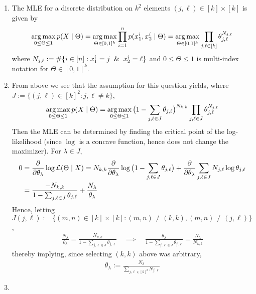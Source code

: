 \documentclass{article}
\begin{document}
\begin{enumerate}
\item The MLE for a discrete distribution on $k^2$ elements
  $(j,\ell) \in [k]\times [k]$ is given by
  \begin{align*}
    \mathop{\rm arg\,max}_{0\leq \Theta \leq 1} p(X \mid \Theta) = \mathop{\rm arg\,max}_{\Theta\in [0,1]^k}
    \prod_{i=1}^n p(x^i_1, x^i_2 \mid \Theta) = \mathop{\rm arg\,max}_{\Theta \in [0,1]^k}
    \prod_{j,\ell \in [k]} \theta_{j,\ell}^{N_{j,\ell}}
  \end{align*}
  where $N_{j,\ell} := \#\{ i \in [n] : x^i_1 = j \And x^i_2 = \ell \}$ and
  $0 \leq \Theta \leq 1$ is multi-index notation for
  $\Theta \in [0,1]^k$.

\item From above we see that the assumption for this question yields, where $J
  := \{ (j,\ell) \in [k]^2 : j, \ell \neq k\}$,
  \begin{align*}
    \mathop{\rm arg\,max}_{0 \leq \Theta \leq 1} p(X \mid \Theta) = \mathop{\rm arg\,max}_{0 \leq \Theta
    \leq 1} \big( 1 - \sum_{j, \ell \in J} \theta_{j, \ell} \big)^{N_{k,k}} \prod_{j,\ell \in J} \theta_{j, \ell}^{N_{j,\ell}}
  \end{align*}
  Then the MLE can be determined by finding the critical point of the
  log-likelihood (since $\log$ is a concave function, hence does not change the
  maximizer). For $\lambda \in J$,
  \begin{align*}
    0 &= \frac{\partial}{\partial\theta_\lambda} \log \mathcal{L}(\Theta \mid X) =
        N_{k,k}\frac{\partial}{\partial\theta_\lambda} \log\big(1 -
        \sum_{j,\ell \in J} \theta_{j,\ell}\big)
        + \frac{\partial}{\partial\theta_\lambda} \sum_{j,\ell \in J} N_{j, \ell} \log \theta_{j, \ell}
    \\
      &= \frac{-N_{k,k}}{1 - \sum_{j,\ell \in J}\theta_{j,\ell}} +
        \frac{N_\lambda}{\theta_\lambda}
  \end{align*}
  Hence, letting
  $J(j,\ell) := \{(m,n) \in [k]\times [k] : (m,n) \neq (k,k), (m,n) \neq
  (j,\ell)\}$,
  \begin{align*}
    \frac{N_\lambda}{\theta_\lambda} = \frac{N_{k,k}}{1 - \sum_{j,\ell \in J}
    \theta_{j,\ell}} \quad \implies \quad \frac{\theta_\lambda}{1 -\sum_{j,\ell
    \in J} \theta_{j,\ell}} = \frac{N_\lambda}{N_{k,k}}
  \end{align*}
  thereby implying, since selecting $(k,k)$ above was arbitrary,
  \begin{align*}
    \theta_\lambda := \frac{N_\lambda}{\sum_{j,\ell \in [k]^2} N_{j,\ell}}
  \end{align*}

\item 
  
\end{enumerate}
\end{document}
